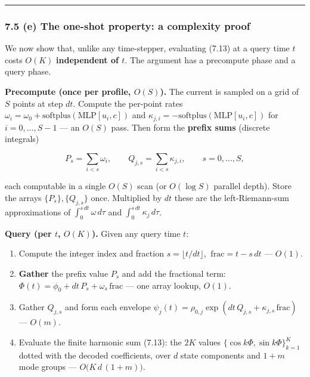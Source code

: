 \documentclass[
  11pt,
]{article}
\providecommand{\tightlist}{%
  \setlength{\itemsep}{0pt}\setlength{\parskip}{0pt}}
\providecommand{\lt}{<}
\begin{document}
\begin{center}\rule{0.5\linewidth}{0.5pt}\end{center}

\subsubsection{7.5 (e) The one-shot property: a complexity
proof}\label{e-the-one-shot-property-a-complexity-proof}

We now show that, unlike any time-stepper, evaluating (7.13) at a query
time \(t\) costs \(O(K)\) \textbf{independent of \(t\)}. The argument
has a precompute phase and a query phase.

\textbf{Precompute (once per profile, \(O(S)\)).} The current is sampled
on a grid of \(S\) points at step \(dt\). Compute the per-point rates
\(\omega_i=\omega_0+\mathrm{softplus}(\mathrm{MLP}[u_i,c])\) and
\(\kappa_{j,i}=-\mathrm{softplus}(\mathrm{MLP}[u_i,c])\) for
\(i=0,\dots,S-1\) --- an \(O(S)\) pass. Then form the \textbf{prefix
sums} (discrete integrals)

\[
P_s=\sum_{i\lt s}\omega_i,\qquad Q_{j,s}=\sum_{i\lt s}\kappa_{j,i},\qquad s=0,\dots,S, \tag{7.18}
\]

each computable in a single \(O(S)\) scan (or \(O(\log S)\) parallel
depth). Store the arrays \(\{P_s\},\{Q_{j,s}\}\) once. Multiplied by
\(dt\) these are the left-Riemann-sum approximations of
\(\int_0^{s\,dt}\omega\,d\tau\) and \(\int_0^{s\,dt}\kappa_j\,d\tau\).

\textbf{Query (per \(t\), \(O(K)\)).} Given any query time \(t\):

\begin{enumerate}
\def\labelenumi{\arabic{enumi}.}
\tightlist
\item
  Compute the integer index and fraction \(s=\lfloor t/dt\rfloor\),
  \(\ \mathrm{frac}=t-s\,dt\) --- \(O(1)\).
\item
  \textbf{Gather} the prefix value \(P_s\) and add the fractional term:
  \(\Phi(t)=\phi_0+dt\,P_s+\omega_s\,\mathrm{frac}\) --- one array
  lookup, \(O(1)\).
\item
  Gather \(Q_{j,s}\) and form each envelope
  \(\psi_j(t)=\rho_{0,j}\exp(dt\,Q_{j,s}+\kappa_{j,s}\,\mathrm{frac})\)
  --- \(O(m)\).
\item
  Evaluate the finite harmonic sum (7.13): the \(2K\) values
  \(\{\cos k\Phi,\sin k\Phi\}_{k=1}^K\) dotted with the decoded
  coefficients, over \(d\) state components and \(1+m\) mode groups ---
  \(O\big(K\,d\,(1+m)\big)\).
\end{enumerate}
\end{document}
